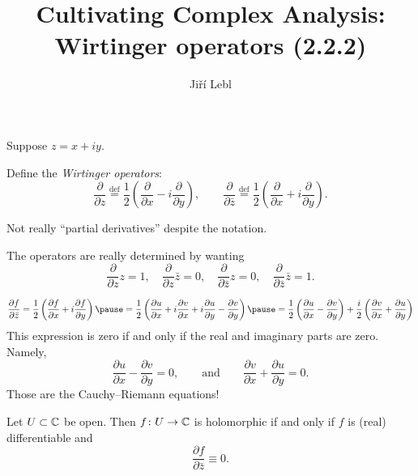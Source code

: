 \documentclass[10pt,aspectratio=169]{beamer}
\author{Ji\v{r}\'i Lebl}
\institute[OSU]{%
Departemento pri Matematiko de Oklahoma {\^S}tata Universitato}
\title{Cultivating Complex Analysis:\\%
Wirtinger operators (2.2.2)}
\date{}
\begin{document}
\begin{frame}
\titlepage
\end{frame}

\begin{frame}
Suppose $z=x+iy$.

\medskip
\pause

Define
the \emph{Wirtinger operators}:
\[
\frac{\partial}{\partial z}
\overset{\text{def}}{=}
\frac{1}{2}
\left(
\frac{\partial}{\partial x} - i
\frac{\partial}{\partial y}
\right),
\qquad
\frac{\partial}{\partial \bar{z}}
\overset{\text{def}}{=}
\frac{1}{2}
\left(
\frac{\partial}{\partial x} + i
\frac{\partial}{\partial y}
\right) .
\]

\pause

Not really ``partial derivatives'' despite the notation.

\medskip
\pause

The operators are really determined by wanting
\[
\frac{\partial}{\partial z} z = 1, \quad
\frac{\partial}{\partial z} \bar{z} = 0, \quad
\frac{\partial}{\partial \bar{z}} z = 0, \quad
\frac{\partial}{\partial \bar{z}} \bar{z} = 1.
\]
\end{frame}

\begin{frame}
\[
\frac{\partial f}{\partial \bar{z}} 
=
\frac{1}{2}
\left(
\frac{\partial f}{\partial x} + i
\frac{\partial f}{\partial y}
\right)
\pause
=
\frac{1}{2}
\left(
\frac{\partial u}{\partial x} 
+ i \frac{\partial v}{\partial x} 
+ i \frac{\partial u}{\partial y}
- \frac{\partial v}{\partial y}
\right) 
\pause
=
\frac{1}{2}
\left(
\frac{\partial u}{\partial x} 
- \frac{\partial v}{\partial y}
\right)
+
\frac{i}{2}
\left(
\frac{\partial v}{\partial x} 
+ \frac{\partial u}{\partial y}
\right)
\]
\pause
This expression is zero if and only if the real and imaginary
parts are zero. \pause  Namely,
\[
\frac{\partial u}{\partial x} 
- \frac{\partial v}{\partial y}
= 0,
\qquad
\text{and}
\qquad
\frac{\partial v}{\partial x} 
+ \frac{\partial u}{\partial y} = 0
.
\]
\pause
Those are the Cauchy--Riemann equations!

\pause

\begin{proposition}
Let $U \subset {\mathbb{C}}$ be open.  Then $f \colon U \to {\mathbb{C}}$ is
holomorphic if and only if
$f$ is (real) differentiable and
\begin{equation*}
\frac{\partial f}{\partial \bar{z}} \equiv 0 .
\end{equation*}
\end{proposition}
\end{frame}
\end{document}
